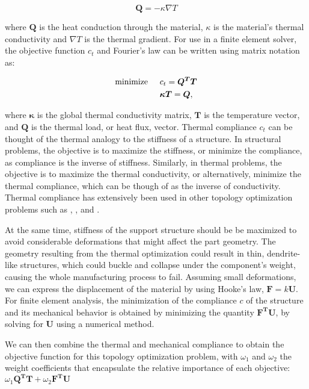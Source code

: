 \documentclass[../main.tex]{subfiles}
\begin{document}
\begin{equation}
  \label{eq:Fourier Law}
  \bm{Q} = -\kappa \nabla T
\end{equation}

where $\bm{Q}$ is the heat conduction through the material, $\kappa$ is the material's thermal conductivity and $\nabla T$ is the thermal gradient. For use in a finite element solver, the objective function $c_t$ and Fourier's law can be written using matrix notation as:

\begin{align}
  \text{minimize} \hspace{0.5cm} & c_t = \bm{Q^T} \bm{T} \\
           & \bm{\kappa}\bm{T}  = \bm{Q},
\end{align}

where $\bm{\kappa}$ is the global thermal conductivity matrix, $\bm{T}$ is the temperature vector, and $\bm{Q}$ is the thermal load, or heat flux, vector. Thermal compliance $c_t$ can be thought of the thermal analogy to the stiffness of a structure. In structural problems, the objective is to maximize the stiffness, or minimize the compliance, as compliance is the inverse of stiffness. Similarly, in thermal problems, the objective is to maximize the thermal conductivity, or alternatively, minimize the thermal compliance, which can be though of as the inverse of conductivity. Thermal compliance has extensively been used in other topology optimization problems such as \cite{leeObjectiveFunctionTopology2021}, \cite{yoonTopologicalDesignHeat2010}, and \cite{brunsTopologyOptimizationConvectiondominated2007}.

At the same time, stiffness of the support structure should be be maximized to avoid considerable deformations that might affect the part geometry. The geometry resulting from the thermal optimization could result in thin, dendrite-like structures, which could buckle and collapse under the component's weight, causing the whole manufacturing process to fail. Assuming small deformations, we can express the displacement of the material by using Hooke's law, $\bm{F} = k\bm{U}$.
For finite element analysis, the minimization of the compliance $c$ of the structure and its mechanical behavior is obtained by minimizing the quantity $\bm{F^T}\bm{U}$, by solving for $\bm{U}$ using a numerical method.

We can then combine the thermal and mechanical compliance to obtain the objective function for this topology optimization problem, with $\omega_1$ and $\omega_2$ the weight coefficients that encapsulate the relative importance of each objective: $\omega_1 \bm{Q^T} \bm{T} + \omega_2 \bm{F^T} \bm{U}$
\end{document}
